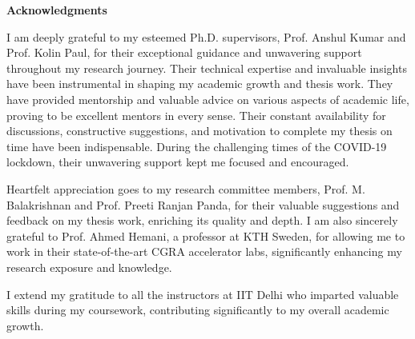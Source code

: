 

{}
\begin{center}
	{\Huge \textbf{Acknowledgments}} 
\end{center}


\vspace{0.30cm}

I am deeply grateful to my esteemed Ph.D. supervisors, Prof. Anshul Kumar and Prof. Kolin Paul, for their exceptional guidance and unwavering support throughout my research journey. Their technical expertise and invaluable insights have been instrumental in shaping my academic growth and thesis work. They have provided mentorship and valuable advice on various aspects of academic life, proving to be excellent mentors in every sense. Their constant availability for discussions, constructive suggestions, and motivation to complete my thesis on time have been indispensable. During the challenging times of the COVID-19 lockdown, their unwavering support kept me focused and encouraged.

Heartfelt appreciation goes to my research committee members, Prof. M. Balakrishnan and Prof. Preeti Ranjan Panda, for their valuable suggestions and feedback on my thesis work, enriching its quality and depth. I am also sincerely grateful to Prof. Ahmed Hemani, a professor at KTH Sweden, for allowing me to work in their state-of-the-art CGRA accelerator labs, significantly enhancing my research exposure and knowledge.

I extend my gratitude to all the instructors at IIT Delhi who imparted valuable skills during my coursework, contributing significantly to my overall academic growth.

